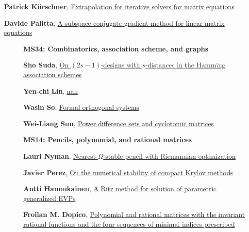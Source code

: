 \documentclass[ILAS2025-program.tex]{subfiles}
\begin{document}
\begin{description}
\begin{description}
{}
        \item[\info{14:30\textrm{--}15:00}] \hypertarget{up0321}{}\textbf{Patrick Kürschner}, \hyperlink{down0321}{Extrapolation for iterative solvers for matrix equations
}
        \item[\info{15:00\textrm{--}15:30}] \hypertarget{up0322}{}\textbf{Davide Palitta}, \hyperlink{down0322}{A subspace-conjugate gradient method for linear matrix equations
}
        \end{description}
    \begin{description}
    \item[] {\color{mstitle}\textbf{MS34: Combinatorics, association scheme, and graphs}} 
    \item[] \hypertarget{up0323}{}\textbf{Sho Suda}, \hyperlink{down0323}{On $(2s-1)$-designs with $s$-distances in the Hamming association schemes
}
        \item[] \hypertarget{up0324}{}\textbf{Yen-chi Lin}, \hyperlink{down0324}{nan}
        \item[] \hypertarget{up0325}{}\textbf{Wasin So}, \hyperlink{down0325}{Formal orthogonal systems}
        \item[] \hypertarget{up0326}{}\textbf{Wei-Liang Sun}, \hyperlink{down0326}{Power difference sets and cyclotomic matrices}
        \end{description}
    \begin{description}
    \item[] {\color{mstitle}\textbf{MS14: Pencils, polynomial, and rational matrices}} 
    \item[] \hypertarget{up0327}{}\textbf{Lauri Nyman}, \hyperlink{down0327}{Nearest $\Omega$-stable pencil with Riemannian optimization}
        \item[] \hypertarget{up0328}{}\textbf{Javier Perez}, \hyperlink{down0328}{On the numerical stability of compact Krylov methods}
        \item[] \hypertarget{up0329}{}\textbf{Antti Hannukainen}, \hyperlink{down0329}{A Ritz method for solution of parametric generalized EVPs}
        \item[] \hypertarget{up0330}{}\textbf{Froilan M. Dopico}, \hyperlink{down0330}{Polynomial and rational matrices with the invariant rational functions and the four sequences of minimal indices prescribed}

\end{description}
\end{description}
\end{document}
